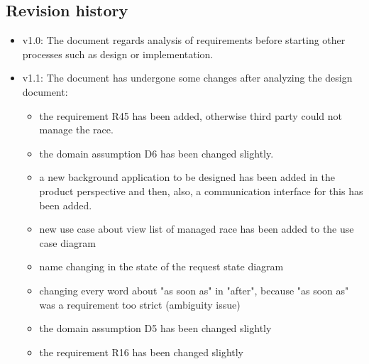 \subsection{Revision history}
\begin{itemize}
\item v1.0: The document regards analysis of requirements before starting other processes such as design or implementation.
\item v1.1: The document has undergone some changes after analyzing the design document:
	\begin{itemize}
	\item the requirement R45 has been added, otherwise third party could not manage the race.
	\item the domain assumption D6 has been changed slightly.
	\item a new background application to be designed has been added in the product perspective and then, also, a communication interface for this has been added.
	\item new use case about view list of managed race has been added to the use case diagram 
	\item name changing in the state of the request state diagram
	\item changing every word about "as soon as" in "after", because "as soon as" was a requirement too strict (ambiguity issue)
	\item the domain assumption D5 has been changed slightly
	\item the requirement R16 has been changed slightly
	\end{itemize}
\end{itemize}